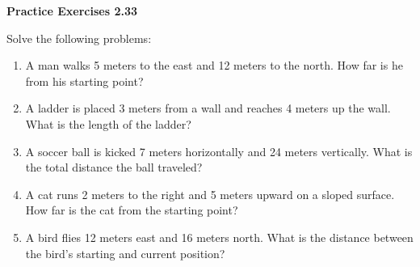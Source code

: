 \vspace{0.3ex}
\noindent\textbf{Practice Exercises 2.33}

\vspace{0.2ex}

Solve the following problems:
\begin{enumerate}[label = \color{blue}\arabic*. ]
    \item A man walks 5 meters to the east and 12 meters to the north. How far is he from his starting point?
    \item A ladder is placed 3 meters from a wall and reaches 4 meters up the wall. What is the length of the ladder?
    \item A soccer ball is kicked 7 meters horizontally and 24 meters vertically. What is the total distance the ball traveled?
    \item A cat runs 2 meters to the right and 5 meters upward on a sloped surface. How far is the cat from the starting point?
    \item A bird flies 12 meters east and 16 meters north. What is the distance between the bird’s starting and current position?
\end{enumerate}
